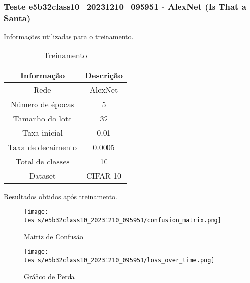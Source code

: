 \subsubsection{Teste e5b32class10_20231210_095951 - AlexNet (Is That a Santa)}

Informações utilizadas para o treinamento.

\begin{table}[ht]
   \centering
   \caption{Treinamento}
   \label{tab:modelos}
   \begin{tabular}{| c | c | }
      \hline 
      \textbf{Informação} & \textbf{Descrição} \\
      \hline \hline 
      Rede & AlexNet \\
      \hline
      Número de épocas & 5\\
      \hline
      Tamanho do lote & 32\\
      \hline
      Taxa inicial & 0.01 \\
      \hline
      Taxa de decaimento & 0.0005 \\
      \hline
      Total de classes & 10\\
      \hline
      Dataset & CIFAR-10\\
      \hline
   \end{tabular} 
\end{table}

Resultados obtidos após treinamento.


\begin{figure}[ht]
 \begin{center}
   \texttt{[image: tests/e5b32class10\_20231210\_095951/confusion\_matrix.png]}
  \caption{Matriz de Confusão}
  \label{fig:fig03}
 \end{center}
\end{figure}

\begin{figure}[ht]
 \begin{center}
   \texttt{[image: tests/e5b32class10\_20231210\_095951/loss\_over\_time.png]}
  \caption{Gráfico de Perda}
  \label{fig:fig04}
 \end{center}
\end{figure}
